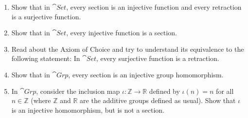 \begin{Exercise}
\begin{enumerate}
\item Show that in $\cat{Set}$, every section is an injective function and every retraction is a surjective function.
\item Show that in $\cat{Set}$, every injective function is a section.
\item Read about the Axiom of Choice and try to understand its equivalence to the following statement: In $\cat{Set}$, every surjective function is a retraction.
\item Show that in $\cat{Grp}$, every section is an injective group homomorphism.
\item In $\cat{Grp}$, consider the inclusion map $\iota \colon \mathbb Z \to \mathbb R$ defined by $\iota(n) = n$ for all $n \in \mathbb Z$ (where $\mathbb Z$ and $\mathbb R$ are the additive groups defined as usual). Show that $\iota$ is an injective homomorphism, but is not a section.
\end{enumerate}
\end{Exercise}



